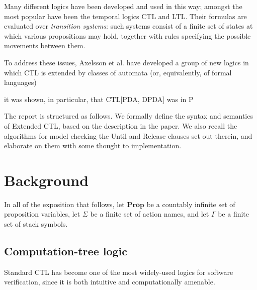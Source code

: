 \documentclass[11pt]{article}
\theoremstyle{definition}
\begin{document}
Many different logics have been developed and used in this way; amongst the
most popular have been the temporal logics CTL and LTL. Their formulas are
evaluated over \textit{transition systems}: such systems consist of a finite
set of states at which various propositions may hold, together with rules
specifying the possible movements between them. %




To address these issues, Axelsson et al. have developed a group of new logics 
in which CTL is extended by classes of automata (or, equivalently, of formal languages)

it was shown, in particular, that CTL[PDA, DPDA] was in P





The report is structured as follows. We formally define the syntax and
semantics of Extended CTL, based on the description in the paper. We also
recall the algorithms for model checking the Until and Release clauses set out
therein, and elaborate on them with some thought to implementation.

\section{Background}

In all of the exposition that follows, let $\textbf{Prop}$ be a countably
infinite set of proposition variables, let $\Sigma$ be a finite set of action
names, and let $\Gamma$ be a finite set of stack symbols.

\subsection{Computation-tree logic}

Standard CTL has become %
one of the most widely-used logics for software verification, since it is both intuitive and computationally amenable.
\end{document}
